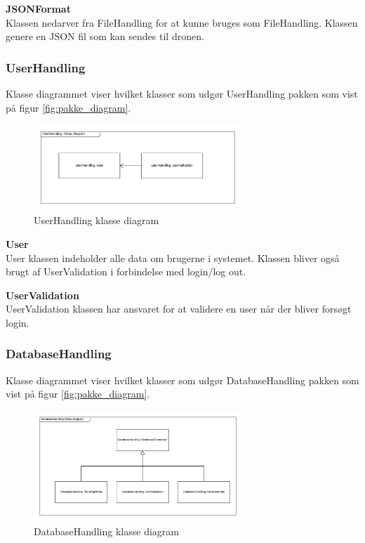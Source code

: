 \textbf{JSONFormat}\\
Klassen nedarver fra FileHandling for at kunne bruges som FileHandling. Klassen genere en JSON fil som kan sendes til dronen.

\newpage
\subsubsection{UserHandling}
Klasse diagrammet viser hvilket klasser som udgør UserHandling pakken som vist på figur \ref{fig:pakke_diagram}.

\vspace{-5pt}
\begin{figure}[H]
	\centering
	\includegraphics[width=0.7\textwidth]{Billeder/klasse_diagrammer/UserHandlingDiagram.png}
	\vspace{-5pt}
	\caption{UserHandling klasse diagram}
	\label{fig:UserHandling_klasse_diagram}
\end{figure}

\textbf{User}\\
User klassen indeholder alle data om brugerne i systemet. Klassen bliver også brugt af UserValidation i forbindelse med login/log out.

\textbf{UserValidation}\\
UserValidation klassen har ansvaret for at validere en user når der bliver forsøgt login.\\

\newpage
\subsubsection{DatabaseHandling}
Klasse diagrammet viser hvilket klasser som udgør DatabaseHandling pakken som vist på figur \ref{fig:pakke_diagram}.

\vspace{-5pt}
\begin{figure}[H]
	\centering
	\includegraphics[width=0.7\textwidth]{Billeder/klasse_diagrammer/DatabaseHandling.png}
	\vspace{-5pt}
	\caption{DatabaseHandling klasse diagram}
	\label{fig:DatabaseHandling_klasse_diagram}
\end{figure}

